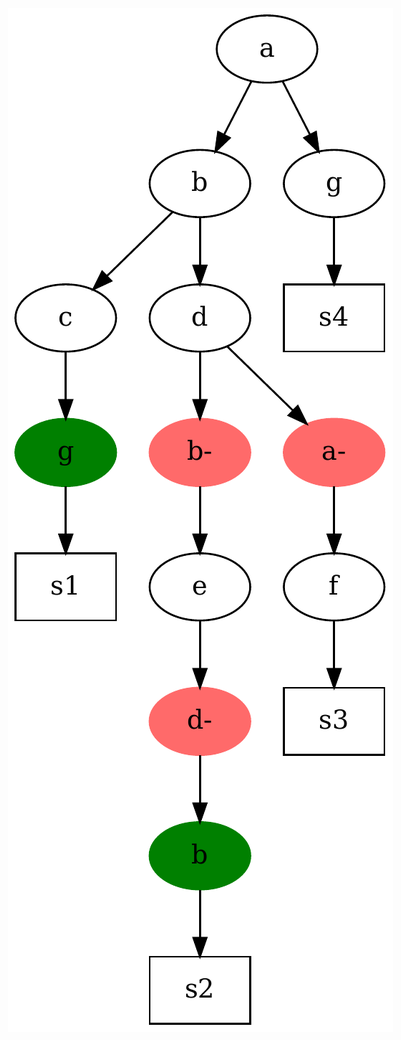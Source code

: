 \documentclass[12pt]{report}
\begin{document}
  \begin{table}[H]
    \begin{minipage}{0.45\textwidth}
    \centering
    \includegraphics[scale = 0.33]{img/tree.pdf}
    \end{minipage}

\end{table}
\end{document}
